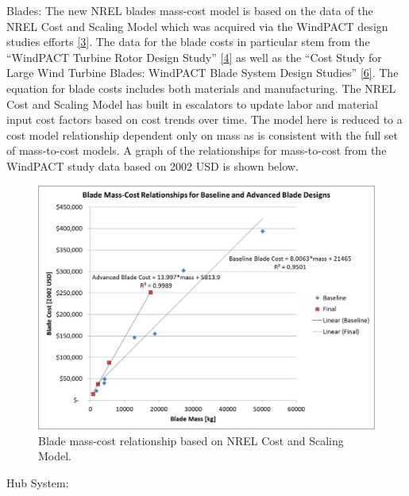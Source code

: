 \documentclass[letterpaper,10pt,openany,oneside]{sphinxmanual}
\begin{document}
Blades:
\label{theory:module-twister.models.csm.blades}
The new NREL blades mass-cost model is based on the data of the NREL Cost and Scaling Model which was acquired via the WindPACT design studies efforts {\hyperref[theory:3]{{[}3{]}}}.  The data for the blade costs in particular stem from the ``WindPACT Turbine Rotor Design Study'' {\hyperref[theory:4]{{[}4{]}}} as well as the ``Cost Study for Large Wind Turbine Blades:  WindPACT Blade System Design Studies'' {\hyperref[theory:6]{{[}6{]}}}.  The equation for blade costs includes both materials and manufacturing.  The NREL Cost and Scaling Model has built in escalators to update labor and material input cost factors based on cost trends over time.  The model here is reduced to a cost model relationship dependent only on mass as is consistent with the full set of mass-to-cost models.  A graph of the relationships for mass-to-cost from the WindPACT study data based on 2002 USD is shown below.
\begin{figure}[htbp]
\centering
\capstart

\includegraphics[width=6.5in]{BladeCost.pdf}
\caption{Blade mass-cost relationship based on NREL Cost and Scaling Model.}\label{theory:bladecost}\end{figure}

Hub System:
\end{document}
